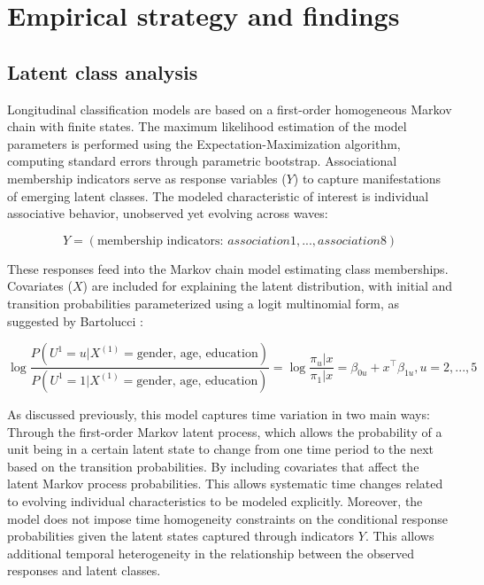 \section{Empirical strategy and findings}


\subsection{Latent class analysis}
Longitudinal classification models are based on a first-order homogeneous Markov chain with finite states. The maximum likelihood estimation of the model parameters is performed using the Expectation-Maximization algorithm, computing standard errors through parametric bootstrap. Associational membership indicators serve as response variables ($Y$) to capture manifestations of emerging latent classes. The modeled characteristic of interest is individual associative behavior, unobserved yet evolving across waves:

\begin{equation}
Y= (\text{membership indicators: } association 1,...,association 8)
\end{equation}

These responses feed into the Markov chain model estimating class memberships. Covariates ($X$) are included for explaining the latent distribution, with initial and transition probabilities parameterized using a logit multinomial form, as suggested by Bartolucci \parencite*{bartolucci_latent_2009}:

\begin{equation}
\log\frac{P(U^{1}=u|X^{(1)}=\text{gender, age, education})}{P(U^{1}=1|X^{(1)}=\text{gender, age, education})}=\log\frac{\pi_{u}|x}{\pi_{1}|x}=\beta_{0u}+x^{\top}\beta_{1u}, u=2,...,5
\end{equation}

As discussed previously, this model captures time variation in two main ways: Through the first-order Markov latent process, which allows the probability of a unit being in a certain latent state to change from one time period to the next based on the transition probabilities.
By including covariates that affect the latent Markov process probabilities. This allows systematic time changes related to evolving individual characteristics to be modeled explicitly. Moreover, the model does not impose time homogeneity constraints on the conditional response probabilities given the latent states captured through indicators $Y$. This allows additional temporal heterogeneity in the relationship between the observed responses and latent classes.
\bigskip

